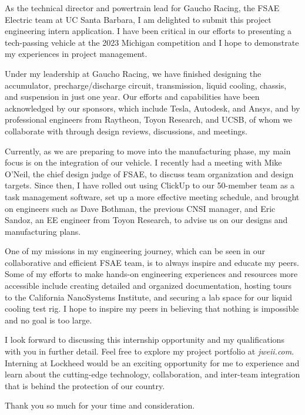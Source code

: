 \documentclass[11pt, letterpaper]{awesome-cv} %
\begin{document}
\makecvheader %

\makelettertitle %


\begin{cvletter}

As the technical director and powertrain lead for Gaucho Racing, the FSAE Electric team at UC Santa Barbara, I am delighted to submit this project engineering intern application. I have been critical in our efforts to presenting a tech-passing vehicle at the 2023 Michigan competition and I hope to demonstrate my experiences in project management.

Under my leadership at Gaucho Racing, we have finished designing the accumulator, precharge/discharge circuit, transmission, liquid cooling, chassis, and suspension in just one year. Our efforts and capabilities have been acknowledged by our sponsors, which include Tesla, Autodesk, and Ansys, and by professional engineers from Raytheon, Toyon Research, and UCSB, of whom we collaborate with through design reviews, discussions, and meetings. 

Currently, as we are preparing to move into the manufacturing phase, my main focus is on the integration of our vehicle. I recently had a meeting with Mike O'Neil, the chief design judge of FSAE, to discuss team organization and design targets. Since then, I have rolled out using ClickUp to our 50-member team as a task management software, set up a more effective meeting schedule, and brought on engineers such as Dave Bothman, the previous CNSI manager, and Eric Sandoz, an EE engineer from Toyon Research, to advise us on our designs and manufacturing plans.

One of my missions in my engineering journey, which can be seen in our collaborative and efficient FSAE team, is to always inspire and educate my peers. Some of my efforts to make hands-on engineering experiences and resources more accessible include creating detailed and organized documentation, hosting tours to the California NanoSystems Institute, and securing a lab space for our liquid cooling test rig. I hope to inspire my peers in believing that nothing is impossible and no goal is too large.

I look forward to discussing this internship opportunity and my qualifications with you in further detail. Feel free to explore my project portfolio at \textit{jweii.com}. Interning at Lockheed would be an exciting opportunity for me to experience and learn about the cutting-edge technology, collaboration, and inter-team integration that is behind the protection of our country. 

Thank you so much for your time and consideration.



\end{cvletter}


\makeletterclosing %
\end{document}
